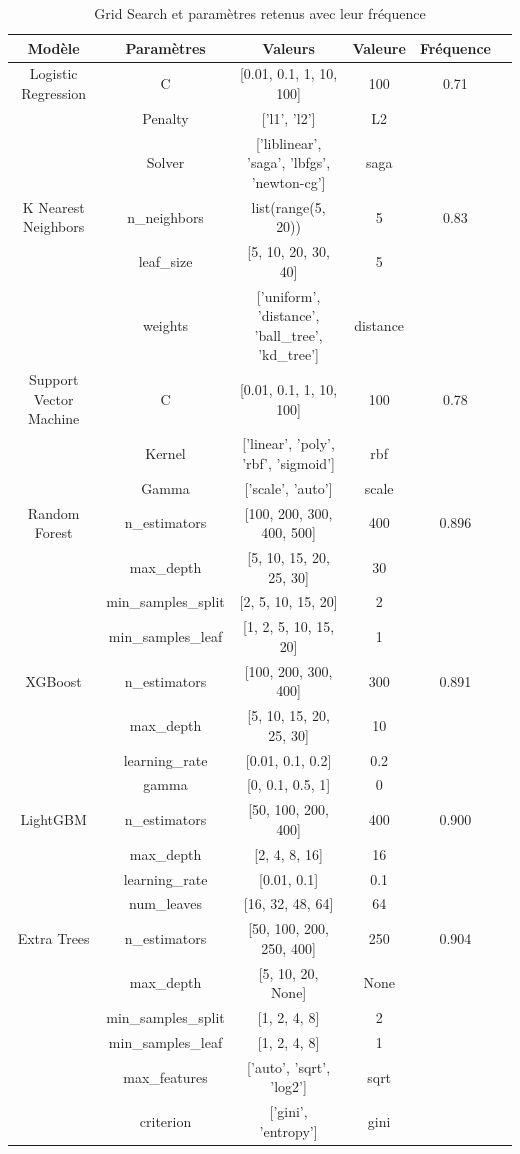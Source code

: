 \documentclass{article}
\begin{document}
\begin{table}[h]
\centering
\begin{tabular}{|c|c|c|c|c|c|}
\hline
Modèle & Paramètres & Valeurs &  Valeure  & Fréquence \\
\hline
Logistic Regression & C & [0.01, 0.1, 1, 10, 100] & 100 & 0.71 \\
 & Penalty & ['l1', 'l2'] & L2 & \\
 & Solver & ['liblinear', 'saga', 'lbfgs', 'newton-cg'] & saga & \\
\hline
K Nearest Neighbors & n\_neighbors & list(range(5, 20)) & 5 & 0.83 \\
 & leaf\_size & [5, 10, 20, 30, 40] & 5 & \\
 & weights & ['uniform', 'distance', 'ball\_tree', 'kd\_tree'] & distance & \\
\hline
Support Vector Machine & C & [0.01, 0.1, 1, 10, 100] & 100 & 0.78 \\
 & Kernel & ['linear', 'poly', 'rbf', 'sigmoid'] & rbf & \\
 & Gamma & ['scale', 'auto'] & scale & \\
\hline
Random Forest & n\_estimators & [100, 200, 300, 400, 500] & 400 & 0.896 \\
 & max\_depth & [5, 10, 15, 20, 25, 30] & 30 & \\
 & min\_samples\_split & [2, 5, 10, 15, 20] & 2 & \\
 & min\_samples\_leaf & [1, 2, 5, 10, 15, 20] & 1 & \\
\hline
XGBoost & n\_estimators & [100, 200, 300, 400] & 300 & 0.891 \\
 & max\_depth & [5, 10, 15, 20, 25, 30] & 10 & \\
 & learning\_rate & [0.01, 0.1, 0.2] & 0.2 & \\
 & gamma & [0, 0.1, 0.5, 1] & 0 & \\
\hline
LightGBM & n\_estimators & [50, 100, 200, 400] & 400 & 0.900 \\
 & max\_depth & [2, 4, 8, 16] & 16 & \\
 & learning\_rate & [0.01, 0.1] & 0.1 & \\
 & num\_leaves & [16, 32, 48, 64] & 64 & \\
\hline
Extra Trees & n\_estimators & [50, 100, 200, 250, 400]& 250 & 0.904 \\
 & max\_depth & [5, 10, 20, None] & None & \\
 & min\_samples\_split & [1, 2, 4, 8] & 2 & \\
 & min\_samples\_leaf & [1, 2, 4, 8] & 1 & \\
 & max\_features & ['auto', 'sqrt', 'log2'] & sqrt & \\
 & criterion & ['gini', 'entropy'] & gini & \\
\hline
\end{tabular}
\caption{Grid Search et paramètres retenus avec leur fréquence}
\label{tab:my_label}
\end{table}
\end{document}
